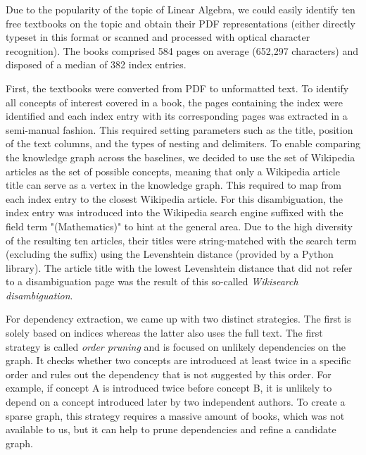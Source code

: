 \documentclass{article}
\begin{document}
Due to the popularity of the topic of Linear Algebra, we could easily identify ten free textbooks on the topic and obtain their PDF representations (either directly typeset in this format or scanned and processed with optical character recognition). The books comprised 584 pages on average (652,297 characters) and disposed of a median of 382 index entries.


First, the textbooks were converted from PDF to unformatted text. To identify all concepts of interest covered in a book, the pages containing the index were identified and each index entry with its corresponding pages was extracted in a semi-manual fashion. This required setting parameters such as the title, position of the text columns, and the types of nesting and delimiters. To enable comparing the knowledge graph across the baselines, we decided to use the set of Wikipedia articles as the set of possible concepts, meaning that only a Wikipedia article title can serve as a vertex in the knowledge graph. This required to map from each index entry to the closest Wikipedia article. For this disambiguation, the index entry was introduced into the Wikipedia search engine suffixed with the field term "(Mathematics)" to hint at the general area. Due to the high diversity of the resulting ten articles, their titles were string-matched with the search term (excluding the suffix) using the Levenshtein distance (provided by a Python library). The article title with the lowest Levenshtein distance that did not refer to a disambiguation page was the result of this so-called \textit{Wikisearch disambiguation}.


For dependency extraction, we came up with two distinct strategies.
The first is solely based on indices whereas the latter also uses the full text. The first strategy is called \textit{order pruning} and is focused on unlikely dependencies on the graph. It checks whether two concepts are introduced at least twice in a specific order and rules out the dependency that is not suggested by this order. For example, if concept A is introduced twice before concept B, it is unlikely to depend on a concept introduced later by two independent authors. To create a sparse graph, this strategy requires a massive amount of books, which was not available to us, but it can help to prune dependencies and refine a candidate graph.
\end{document}
